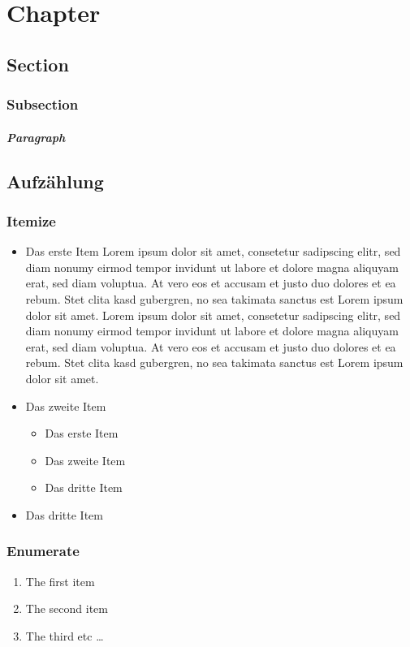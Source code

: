 \chapter{Chapter}
\thispagestyle{fancy} %
\blindtext
\section{Section}
\blindtext
\subsection{Subsection}
\blindtext
\paragraph{Paragraph} \hfill \newline
\blindtext
\section{Aufzählung}
\subsection{Itemize}
\begin{itemize}
\item Das erste Item
Lorem ipsum dolor sit amet, consetetur sadipscing elitr, sed diam nonumy eirmod tempor invidunt ut labore et dolore magna aliquyam erat, sed diam voluptua. At vero eos et accusam et justo duo dolores et ea rebum. Stet clita kasd gubergren, no sea takimata sanctus est Lorem ipsum dolor sit amet. Lorem ipsum dolor sit amet, consetetur sadipscing elitr, sed diam nonumy eirmod tempor invidunt ut labore et dolore magna aliquyam erat, sed diam voluptua. At vero eos et accusam et justo duo dolores et ea rebum. Stet clita kasd gubergren, no sea takimata sanctus est Lorem ipsum dolor sit amet.
\item Das zweite Item
\begin{itemize}
\item Das erste Item
\item Das zweite Item
\item Das dritte Item
\end{itemize}
\item Das dritte Item
\end{itemize}

\subsection{Enumerate}
\begin{enumerate}
  \item The first item
  \item The second item
  \item The third etc \ldots
\end{enumerate}

